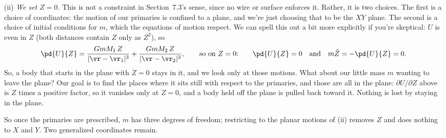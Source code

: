 \documentclass[12pt]{article}
\numberwithin{equation}{section}
\begin{document}
\smallskip
\noindent (ii) \emph{We set $Z = 0$.} This is not a constraint in Section~7.3's
sense, since no wire or surface enforces it. Rather, it is two choices. The first is a
choice of coordinates: the motion of our primaries is confined to a plane, and we're just
choosing that to be the $XY$ plane. The second is a choice of initial conditions for $m$,
which the equations of motion respect. We can spell this out a bit more explicitly if you're
skeptical: $U$ is even in $Z$ (both distances contain $Z$ only as $Z^2$), so
\begin{equation*}
  \pd{U}{Z} = \frac{GmM_1\, Z}{|\vr - \vr_1|^3} + \frac{GmM_2\, Z}{|\vr - \vr_2|^3},
  \qquad\text{so on $Z = 0$:}\qquad \pd{U}{Z} = 0 \quad\text{and}\quad
  m\ddot Z = -\pd{U}{Z} = 0 .
\end{equation*}
So, a body that starts in the plane with $\dot Z = 0$ stays in
it, and we look only at those motions. What about our little mass $m$ wanting to leave the
plane? Our goal is to find the places where it sits still with respect to the primaries, and
those are all in the plane: $\partial U/\partial Z$ above is $Z$ times a positive factor, so
it vanishes only at $Z = 0$, and a body held off the plane is pulled back toward it. Nothing is
lost by staying in the plane.

\smallskip
\noindent So once the primaries are prescribed, $m$ has three degrees of freedom; restricting
to the planar motions of (ii) removes $Z$ and does nothing to $X$ and $Y$. Two generalized
coordinates remain.

\medskip
\end{document}
